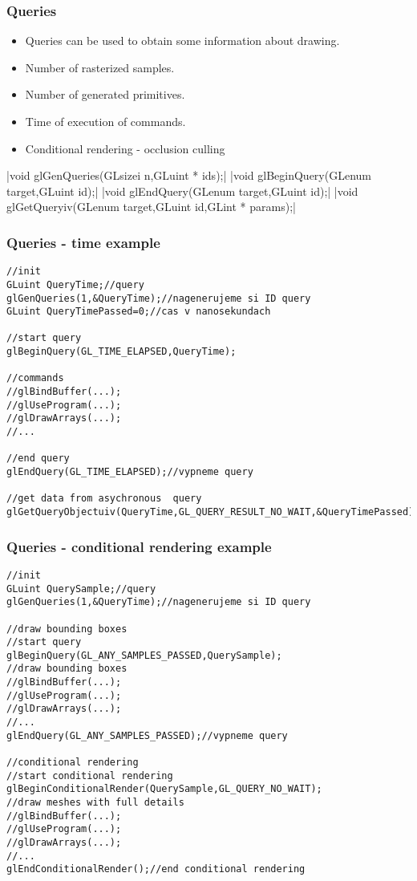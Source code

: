 
\begin{frame}
\frametitle{Queries}
	\begin{itemize}
	\item Queries can be used to obtain some information about drawing.
	\item Number of rasterized samples.
	\item Number of generated primitives.
	\item Time of execution of commands.
	\item Conditional rendering - occlusion culling
	\end{itemize}
	{\scriptsize
	|void glGenQueries(GLsizei n,GLuint * ids);|
	|void glBeginQuery(GLenum target,GLuint id);|
	|void glEndQuery(GLenum target,GLuint id);|
	|void glGetQueryiv(GLenum target,GLuint id,GLint * params);|
	}
\end{frame}

\begin{frame}[fragile]
\frametitle{Queries - time example}
{\scriptsize
\begin{verbatim}
//init
GLuint QueryTime;//query
glGenQueries(1,&QueryTime);//nagenerujeme si ID query
GLuint QueryTimePassed=0;//cas v nanosekundach

//start query
glBeginQuery(GL_TIME_ELAPSED,QueryTime);

//commands
//glBindBuffer(...);
//glUseProgram(...);
//glDrawArrays(...);
//...

//end query
glEndQuery(GL_TIME_ELAPSED);//vypneme query

//get data from asychronous  query
glGetQueryObjectuiv(QueryTime,GL_QUERY_RESULT_NO_WAIT,&QueryTimePassed);
\end{verbatim}
}
\end{frame}

\begin{frame}[fragile]
\frametitle{Queries - conditional rendering example}
{\scriptsize
\begin{verbatim}
//init
GLuint QuerySample;//query
glGenQueries(1,&QueryTime);//nagenerujeme si ID query

//draw bounding boxes
//start query
glBeginQuery(GL_ANY_SAMPLES_PASSED,QuerySample);
//draw bounding boxes 
//glBindBuffer(...);
//glUseProgram(...);
//glDrawArrays(...);
//...
glEndQuery(GL_ANY_SAMPLES_PASSED);//vypneme query

//conditional rendering
//start conditional rendering
glBeginConditionalRender(QuerySample,GL_QUERY_NO_WAIT);
//draw meshes with full details
//glBindBuffer(...);
//glUseProgram(...);
//glDrawArrays(...);
//...
glEndConditionalRender();//end conditional rendering
\end{verbatim}
}
\end{frame}

